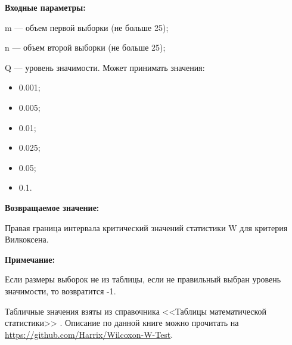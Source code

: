 \textbf{Входные параметры:}

    m --- объем первой выборки (не больше 25);
 
    n --- объем второй выборки (не больше 25);
 
    Q --- уровень значимости. Может принимать значения:
	
\begin{itemize}
\item 0.001;
\item 0.005; 
\item 0.01; 
\item 0.025; 
\item 0.05; 
\item 0.1.
\end{itemize}

\textbf{Возвращаемое значение:}

Правая граница интервала критический значений статистики W для критерия Вилкоксена.

\textbf{Примечание:}

     Если размеры выборок не из таблицы, если не правильный выбран уровень значимости, то возвратится -1.
	 
	 Табличные значения взяты из  справочника <<Таблицы математической статистики>> \cite[с. 357]{book:Bolshev1983}. Описание по данной книге можно прочитать на \href {https://github.com/Harrix/Wilcoxon-W-Test} {https://github.com/Harrix/Wilcoxon-W-Test}.
